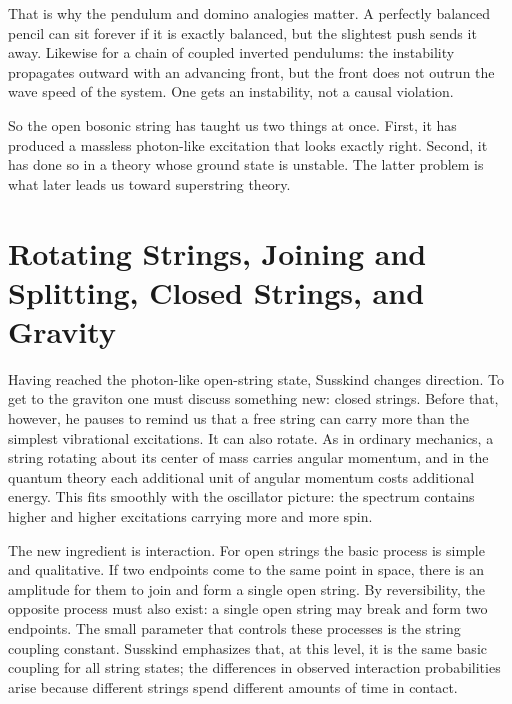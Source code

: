 That is why the pendulum and domino analogies matter. A perfectly balanced pencil can sit forever if it is exactly balanced, but the slightest push sends it away. Likewise for a chain of coupled inverted pendulums: the instability propagates outward with an advancing front, but the front does not outrun the wave speed of the system. One gets an instability, not a causal violation.

So the open bosonic string has taught us two things at once. First, it has produced a massless photon-like excitation that looks exactly right. Second, it has done so in a theory whose ground state is unstable. The latter problem is what later leads us toward superstring theory.

\section{Rotating Strings, Joining and Splitting, Closed Strings, and Gravity}

Having reached the photon-like open-string state, Susskind changes direction. To get to the graviton one must discuss something new: closed strings. Before that, however, he pauses to remind us that a free string can carry more than the simplest vibrational excitations. It can also rotate. As in ordinary mechanics, a string rotating about its center of mass carries angular momentum, and in the quantum theory each additional unit of angular momentum costs additional energy. This fits smoothly with the oscillator picture: the spectrum contains higher and higher excitations carrying more and more spin.

The new ingredient is interaction. For open strings the basic process is simple and qualitative. If two endpoints come to the same point in space, there is an amplitude for them to join and form a single open string. By reversibility, the opposite process must also exist: a single open string may break and form two endpoints. The small parameter that controls these processes is the string coupling constant. Susskind emphasizes that, at this level, it is the same basic coupling for all string states; the differences in observed interaction probabilities arise because different strings spend different amounts of time in contact.

